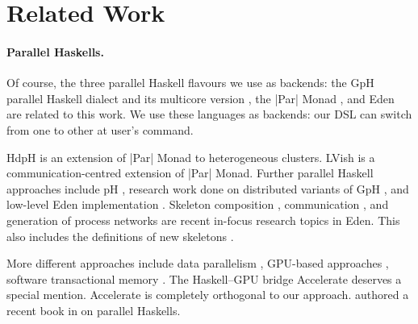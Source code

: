 \section{Related Work}
\label{sec:related-work}

\paragraph{Parallel Haskells.}
Of course, the three parallel Haskell flavours we use as backends: the GpH \cite{Trinder1996,Trinder1998a} parallel Haskell dialect and its multicore version \cite{Marlow2009}, the |Par| Monad \cite{par-monad,Foltzer:2012:MPC:2398856.2364562}, and Eden \cite{eden,Loogen2012} are related to this work. We use these languages as backends: our DSL can switch from one to other at user's command.

HdpH \cite{Maier:2014:HDS:2775050.2633363,stewart_maier_trinder_2016} is an extension of |Par| Monad to heterogeneous clusters. LVish \cite{Kuper:2014:TPE:2666356.2594312} is a communication-centred extension of |Par| Monad.
%
Further parallel Haskell approaches include pH \cite{ph-book}, research work done on distributed variants of GpH \cite{Trinder1996,Aljabri:2013:DIG:2620678.2620682,Aljabri2015}, and low-level Eden implementation \cite{JostThesis,berthold_loidl_hammond_2016}. Skeleton composition \cite{dieterle_horstmeyer_loogen_berthold_2016}, communication \cite{Dieterle2010}, and generation of process networks \cite{Horstmeyer2013} are recent in-focus research topics in Eden. This also includes the definitions of new skeletons \cite{doi:10.1142/S0129626403001380,Eden:PARCO05,Berthold2009-mr,Berthold2009-fft,dieterle2010skeleton,delaEncina2011,Dieterle2013,janjic2013space}.

More different approaches include data parallelism \cite{Chakravarty2007,Keller:2010:RSP:1932681.1863582}, GPU-based approaches \cite{Mainland:2010:NEC:2088456.1863533,obsidian-phd}, software transactional memory \cite{Harris:2005:CMT:1065944.1065952,Perfumo:2008:LST:1366230.1366241}.
%
The Haskell--GPU bridge Accelerate \cite{Chakravarty:2011:AHA:1926354.1926358,CMCK14,McDonell:2015:TRC:2887747.2804313} deserves a special mention. Accelerate is completely orthogonal to our approach. \citeauthor{marlow2013parallel} authored a recent book in \citeyear{marlow2013parallel} on parallel Haskells.

